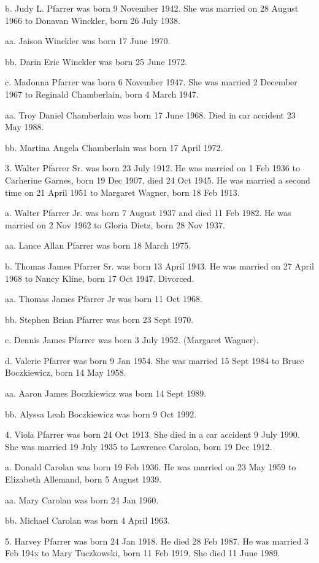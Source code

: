 \documentclass[a4paper]{article}
\begin{document}
b. Judy L. Pfarrer was born 9 November 1942.  She was married on 28 August 1966 to Donavan Winckler, born 26 July 1938.

aa. Jaison Winckler was born 17 June 1970.

bb. Darin Eric Winckler was born 25 June 1972.

c. Madonna Pfarrer was born 6 November 1947.  She was married 2 December 1967 to Reginald Chamberlain, born 4 March 1947.

aa. Troy Daniel Chamberlain was born 17 June 1968.  Died in car accident 23 May 1988.

bb. Martina Angela Chamberlain was born 17 April 1972.

3. Walter Pfarrer Sr. was born 23 July 1912.  He was married on 1 Feb 1936 to Carherine Garnes, born 19 Dec 1907, died 24 Oct 1945.  He was married a second time on 21 April 1951 to Margaret Wagner, born 18 Feb 1913.

a. Walter Pfarrer Jr. was born 7 August 1937 and died 11 Feb 1982. He was married on 2 Nov 1962 to Gloria Dietz, born 28 Nov 1937.

aa. Lance Allan Pfarrer was born 18 March 1975.

b. Thomas James Pfarrer Sr. was born 13 April 1943.  He was married on 27 April 1968 to Nancy Kline, born 17 Oct 1947. Divorced.

aa. Thomas James Pfarrer Jr was born 11 Oct 1968.

bb. Stephen Brian Pfarrer was born 23 Sept 1970.

c. Dennis James Pfarrer was born 3 July 1952.  (Margaret Wagner).

d. Valerie Pfarrer was born 9 Jan 1954.  She was married 15 Sept 1984 to Bruce Boczkiewicz, born 14 May 1958.

aa. Aaron James Boczkiewicz was born 14 Sept 1989.

bb. Alyssa Leah Boczkiewicz was born 9 Oct 1992.

4. Viola Pfarrer was born 24 Oct 1913.  She died in a car accident 9 July 1990. She was married 19 July 1935 to Lawrence Carolan, born 19 Dec 1912.  

a. Donald Carolan was born 19 Feb 1936.  He was married on 23 May 1959 to Elizabeth Allemand, born 5 August 1939.

aa. Mary Carolan was born 24 Jan 1960.

bb. Michael Carolan was born 4 April 1963.

5. Harvey Pfarrer was born 24 Jan 1918.  He died 28 Feb 1987.  He was married 3 Feb 194x to Mary Tuczkowski, born 11 Feb 1919.  She died 11 June 1989.
\end{document}

